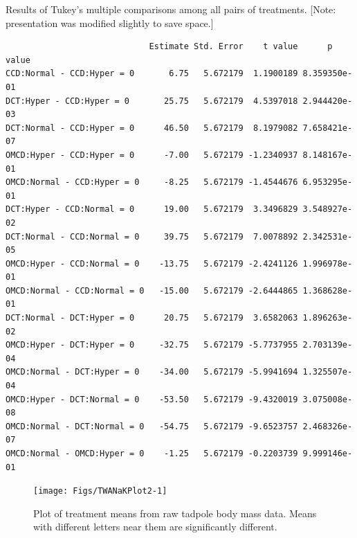 \documentclass[10pt,openany]{book}\usepackage[]{graphicx}\usepackage[]{color}
\makeatletter
\newenvironment{kframe}{%
 \def\at@end@of@kframe{}%
 \ifinner\ifhmode%
  \def\at@end@of@kframe{\end{minipage}}%
  \begin{minipage}{\columnwidth}%
 \fi\fi%
 \def\FrameCommand##1{\hskip\@totalleftmargin \hskip-\fboxsep
 \colorbox{shadecolor}{##1}\hskip-\fboxsep
     \hskip-\linewidth \hskip-\@totalleftmargin \hskip\columnwidth}%
 \MakeFramed {\advance\hsize-\width
   \@totalleftmargin\z@ \linewidth\hsize
   \@setminipage}}%
 {\par\unskip\endMakeFramed%
 \at@end@of@kframe}
\newenvironment{knitrout}{}{} %
\makeatother
\begin{document}
\begin{table}[h]
  \centering
  \caption{Results of Tukey's multiple comparisons among all pairs of treatments.  [Note: presentation was modified slightly to save space.]}\label{tab:TWANaKTukey}
\begin{knitrout}
\color{fgcolor}\begin{kframe}
\begin{verbatim}
                             Estimate Std. Error    t value      p value
CCD:Normal - CCD:Hyper = 0       6.75   5.672179  1.1900189 8.359350e-01
DCT:Hyper - CCD:Hyper = 0       25.75   5.672179  4.5397018 2.944420e-03
DCT:Normal - CCD:Hyper = 0      46.50   5.672179  8.1979082 7.658421e-07
OMCD:Hyper - CCD:Hyper = 0      -7.00   5.672179 -1.2340937 8.148167e-01
OMCD:Normal - CCD:Hyper = 0     -8.25   5.672179 -1.4544676 6.953295e-01
DCT:Hyper - CCD:Normal = 0      19.00   5.672179  3.3496829 3.548927e-02
DCT:Normal - CCD:Normal = 0     39.75   5.672179  7.0078892 2.342531e-05
OMCD:Hyper - CCD:Normal = 0    -13.75   5.672179 -2.4241126 1.996978e-01
OMCD:Normal - CCD:Normal = 0   -15.00   5.672179 -2.6444865 1.368628e-01
DCT:Normal - DCT:Hyper = 0      20.75   5.672179  3.6582063 1.896263e-02
OMCD:Hyper - DCT:Hyper = 0     -32.75   5.672179 -5.7737955 2.703139e-04
OMCD:Normal - DCT:Hyper = 0    -34.00   5.672179 -5.9941694 1.325507e-04
OMCD:Hyper - DCT:Normal = 0    -53.50   5.672179 -9.4320019 3.075008e-08
OMCD:Normal - DCT:Normal = 0   -54.75   5.672179 -9.6523757 2.468326e-07
OMCD:Normal - OMCD:Hyper = 0    -1.25   5.672179 -0.2203739 9.999146e-01
\end{verbatim}
\end{kframe}
\end{knitrout}
\end{table}

\begin{knitrout}
\color{fgcolor}\begin{figure}[hbtp]

{\centering \texttt{[image: Figs/TWANaKPlot2-1]} 

}

\caption[Plot of treatment means from raw tadpole body mass data]{Plot of treatment means from raw tadpole body mass data.  Means with different letters near them are significantly different.}\label{fig:TWANaKPlot2}
\end{figure}


\end{knitrout}
\end{document}
